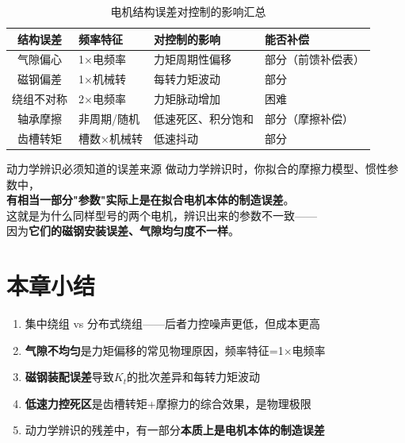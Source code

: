 \begin{table}[H]
\centering
\begin{tabular}{cp{3cm}p{3.5cm}p{3.5cm}}
\toprule
\textbf{结构误差} & \textbf{频率特征} & \textbf{对控制的影响} & \textbf{能否补偿} \\
\midrule
气隙偏心 & 1$\times$电频率 & 力矩周期性偏移 & 部分（前馈补偿表） \\
磁钢偏差 & 1$\times$机械转 & 每转力矩波动 & 部分 \\
绕组不对称 & 2$\times$电频率 & 力矩脉动增加 & 困难 \\
轴承摩擦 & 非周期/随机 & 低速死区、积分饱和 & 部分（摩擦补偿） \\
齿槽转矩 & 槽数$\times$机械转 & 低速抖动 & 部分 \\
\bottomrule
\end{tabular}
\caption{电机结构误差对控制的影响汇总}
\label{tab:motor_errors}
\end{table}

\begin{engineeringbox}{动力学辨识必须知道的误差来源}
做动力学辨识时，你拟合的摩擦力模型、惯性参数中，\\
\textbf{有相当一部分"参数"实际上是在拟合电机本体的制造误差}。\\
这就是为什么同样型号的两个电机，辨识出来的参数不一致——\\
因为\textbf{它们的磁钢安装误差、气隙均匀度不一样}。
\end{engineeringbox}

\section*{本章小结}

\begin{summarybox}{}
\begin{enumerate}
  \item 集中绕组 vs 分布式绕组——后者力控噪声更低，但成本更高
  \item \textbf{气隙不均匀}是力矩偏移的常见物理原因，频率特征=1$\times$电频率
  \item \textbf{磁钢装配误差}导致$K_t$的批次差异和每转力矩波动
  \item \textbf{低速力控死区}是齿槽转矩+摩擦力的综合效果，是物理极限
  \item 动力学辨识的残差中，有一部分\textbf{本质上是电机本体的制造误差}
\end{enumerate}
\end{summarybox}

\newpage
